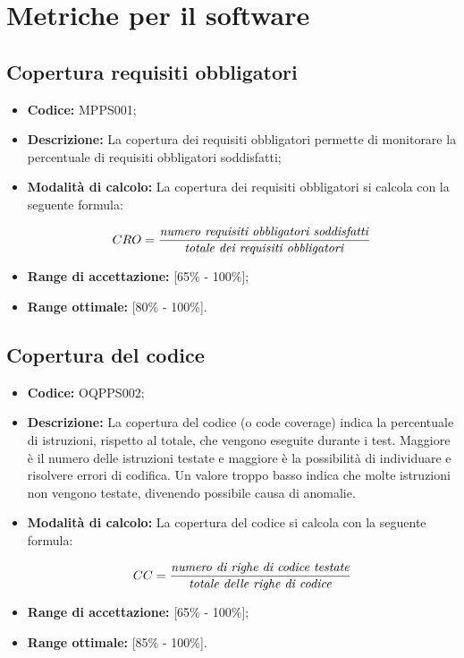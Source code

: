 \documentclass[openany,12pt,a4paper]{report}
\begin{document}

\section{Metriche per il software}

\subsection{Copertura requisiti obbligatori}

\begin{itemize}
    \item \textbf{Codice:} MPPS001;
    \item \textbf{Descrizione:} La copertura dei requisiti obbligatori permette di monitorare la percentuale di requisiti obbligatori soddisfatti;
    \item \textbf{Modalità di calcolo:} La copertura dei requisiti obbligatori si calcola con la seguente formula:
    
    \[ CRO = \frac{\textrm{\textit{numero requisiti obbligatori soddisfatti}}}{\textrm{\textit{totale dei requisiti obbligatori}}} \]
    
    \item \textbf{Range di accettazione:} [65\% - 100\%];
    \item \textbf{Range ottimale:} [80\% - 100\%].
\end{itemize}

\subsection{Copertura del codice}

\begin{itemize}

    \item \textbf{Codice:} OQPPS002;

    \item \textbf{Descrizione:} La copertura del codice (o code coverage) indica la percentuale di istruzioni,  rispetto al totale, che vengono eseguite durante i test. Maggiore è il numero delle istruzioni testate e maggiore è la possibilità di individuare e risolvere errori di codifica. Un valore troppo basso indica che molte istruzioni non vengono testate, divenendo possibile causa di anomalie.
    
    \item \textbf{Modalità di calcolo:} La copertura del codice si calcola con la seguente formula:
    
    \[ CC = \frac{\textrm{\textit{numero di righe di codice testate}}}{\textrm{\textit{totale delle righe di codice}}} \]
    
    \item \textbf{Range di accettazione:} [65\% - 100\%];
    \item \textbf{Range ottimale:} [85\% - 100\%].
\end{itemize}
\end{document}
